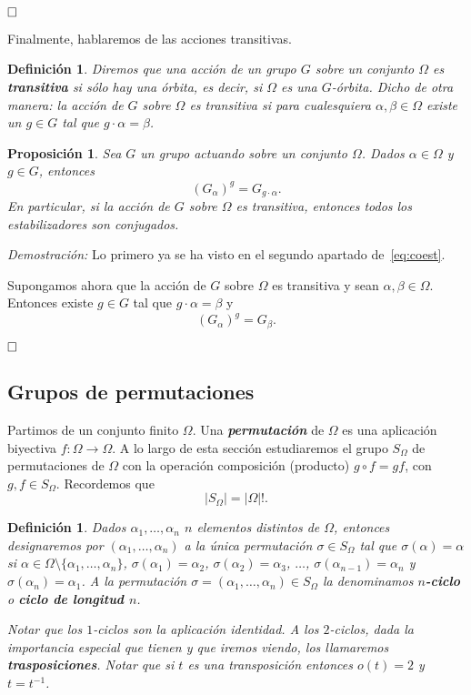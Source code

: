 \documentclass[12pt]{article}
\newtheorem{proposition}[theorem]{Proposición}
\newtheorem{definition}[theorem]{Definición}
\begin{document}
$\hfill \square$

Finalmente, hablaremos de las acciones transitivas.

\begin{definition}Diremos que una acción de un grupo $G$ sobre un conjunto $\Omega$ es \textbf{transitiva} si sólo hay una órbita, es decir, si $\Omega$ es una $G$-órbita. Dicho de otra manera: la acción de $G$ sobre $\Omega$ es transitiva si para cualesquiera $\alpha, \beta \in \Omega$ existe un $g \in G$ tal que $g \cdot \alpha = \beta$.
\end{definition}

\begin{proposition}Sea $G$ un grupo actuando sobre un conjunto $\Omega$. Dados $\alpha \in \Omega$ y $g \in G$, entonces $$(G_\alpha)^g = G_{g\cdot \alpha}.$$ En particular, si la acción de $G$ sobre $\Omega$ es transitiva, entonces todos los estabilizadores son conjugados.
\end{proposition}
\emph{Demostración: }Lo primero ya se ha visto en el segundo apartado de~\ref{eq:coest}.

Supongamos ahora que la acción de $G$ sobre $\Omega$ es transitiva y sean $\alpha, \beta \in \Omega$. Entonces existe $g \in G$ tal que $g \cdot \alpha = \beta$ y $$(G_\alpha)^g = G_\beta.$$

$\hfill \square$

\subsection{Grupos de permutaciones}

Partimos de un conjunto finito $\Omega$. Una \textbf{\textit{permutación}} de $\Omega$ es una aplicación biyectiva $f \colon \Omega \longrightarrow \Omega$. A lo largo de esta sección estudiaremos el grupo $S_\Omega$ de permutaciones de $\Omega$ con la operación composición (producto) $g \circ f = gf$, con $g,f \in S_\Omega$. Recordemos que $$|S_\Omega| = |\Omega|!.$$

\begin{definition}Dados $\alpha_1, \ldots, \alpha_n$ $n$ elementos distintos de $\Omega$, entonces designaremos por $(\alpha_1, \ldots, \alpha_n)$ a la única permutación $\sigma \in S_\Omega$ tal que $\sigma (\alpha) = \alpha$ si $\alpha \in \Omega \setminus \lbrace \alpha_1, \ldots, \alpha_n \rbrace$, $\sigma (\alpha_1)=\alpha_2$, $\sigma (\alpha_2) = \alpha_3$, $\ldots$, $\sigma(\alpha_{n-1}) = \alpha_n$ y $\sigma(\alpha_n) = \alpha_1$. A la permutación $\sigma = (\alpha_1, \ldots, \alpha_n ) \in S_\Omega$ la denominamos \textbf{$n$-ciclo} o \textbf{ciclo de longitud $n$}.

Notar que los $1$-ciclos son la aplicación identidad. A los $2$-ciclos, dada la importancia especial que tienen y que iremos viendo, los llamaremos \textbf{trasposiciones}. Notar que si $t$ es una transposición entonces $o(t)=2$ y $t=t^{-1}$.
\end{definition}
\end{document}
